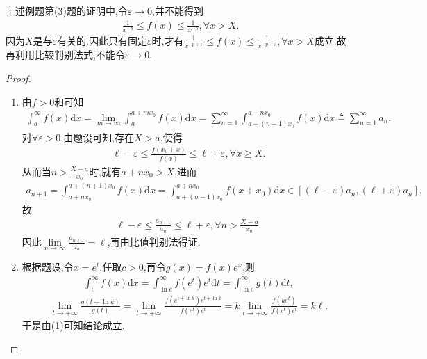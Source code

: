 \documentclass[../../main.tex]{subfiles}%
\begin{document}
\begin{remark}
上述例题第(3)题的证明中,令$\varepsilon \to 0$,并不能得到
\begin{align*}
\frac{1}{x^{-p}}\leqslant f(x)\leqslant \frac{1}{x^{-p}},\forall x>X.
\end{align*}
因为$X$是与$\varepsilon$有关的.因此只有固定$\varepsilon$时,才有$\frac{1}{x^{-p+\varepsilon}}\leqslant f\left( x \right) \leqslant \frac{1}{x^{-p-\varepsilon}},\forall x>X$成立.故再利用比较判别法式,不能令$\varepsilon\to 0$.
\end{remark}
\begin{proof}
\begin{enumerate}[(1)]
\item 由$f>0$和可知
\begin{align*}
\int_a^{\infty}{f\left( x \right) \mathrm{d}x}=\underset{m\rightarrow \infty}{\lim}\int_a^{a+mx_0}{f\left( x \right) \mathrm{d}x}=\sum_{n=1}^{\infty}{\int_{a+\left( n-1 \right) x_0}^{a+nx_0}{f\left( x \right) \mathrm{d}x}}\triangleq \sum_{n=1}^{\infty}{a_n.}
\end{align*}
对$\forall \varepsilon >0$,由题设可知,存在$X>a$,使得
\begin{align*}
\ell -\varepsilon \leqslant \frac{f\left( x_0+x \right)}{f\left( x \right)}\leqslant \ell +\varepsilon ,\forall x\geqslant X.
\end{align*}
从而当$n>\frac{X-a}{x_0}$时,就有$a+nx_0>X$,进而
\begin{align*}
a_{n+1}=\int_{a+nx_0}^{a+\left( n+1 \right) x_0}{f\left( x \right) \mathrm{d}x}=\int_{a+\left( n-1 \right) x_0}^{a+nx_0}{f\left( x+x_0 \right) \mathrm{d}x}\in \left[ \left( \ell -\varepsilon \right) a_n,\left( \ell +\varepsilon \right) a_n \right] ,
\end{align*}
故
\begin{align*}
\ell -\varepsilon \leqslant \frac{a_{n+1}}{a_n}\leqslant \ell +\varepsilon ,\forall n>\frac{X-a}{x_0}.
\end{align*}
因此$\underset{n\rightarrow \infty}{\lim}\frac{a_{n+1}}{a_n}=\ell$,再由比值判别法得证.

\item 根据题设,令$x=e^t$,任取$c>0$,再令$g(x)=f(x)e^x$,则
\begin{align*}
\int_c^{\infty}{f\left( x \right) \mathrm{d}x}=\int_{\ln c}^{\infty}{f\left( e^t \right) e^t\mathrm{d}t}=\int_{\ln c}^{\infty}{g\left( t \right) \mathrm{d}t},
\end{align*}
\begin{align*}
\underset{t\rightarrow +\infty}{\lim}\frac{g\left( t+\ln k \right)}{g\left( t \right)}=\underset{t\rightarrow +\infty}{\lim}\frac{f\left( e^{t+\ln k} \right) e^{t+\ln k}}{f\left( e^t \right) e^t}=k\underset{t\rightarrow +\infty}{\lim}\frac{f\left( ke^t \right)}{f\left( e^t \right) e^t}=k\ell .
\end{align*}
于是由(1)可知结论成立.


\end{enumerate}
\end{proof}
\end{document}
